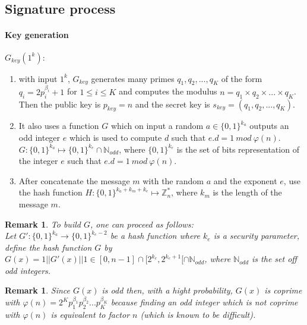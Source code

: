 \documentclass[a4paper,11pt]{article}
\newtheorem{remark}[theorem]{Remark}
\begin{document}
\subsection{Signature process }\label{sec:three:1}

\paragraph{Key generation}  $G_{key}(1^{k}):$

\label{Key generation 1}
\begin{enumerate}
\item  with input $1^k$, $G_{key}$ generates many primes $q_1,q_2,...,q_K$ of the form $q_i=2p_i^{\beta_i}+1$ for $1\leq i \leq K$ and computes the modulus $n=q_1\times q_2\times ...\times q_K$. Then the public key is $p_{key}=n$ and the secret key is $s_{key}=(q_1,q_2,...,q_K)$.
\item  It also uses a function $G$ which on input a random $a \in \{0,1\}^{k_a}$ outputs an odd integer $e$ which is used to compute $d$ such that $e.d=1 \ mod \ \varphi(n)$.\\
$G:\{0,1\}^{k_a}\stackrel{}{\longmapsto}\{0,1\}^{k_e}\cap \mathbb{N}_{odd}$, where  $ \{0,1\}^{k_e}$ is the set of bits representation of the integer $e$ such that $e.d=1 \ mod \ \varphi(n)$.
\item After concatenate the message $m$ with the random $a$ and the exponent $e$, use the hash function $H:\{0,1\}^{k_a+k_m+k_e}\stackrel{}{\longmapsto}\mathbb Z_n^*$, where $k_m$ is the length of the message $m$.\\

\end{enumerate}
 
\begin{remark} To build $G$, one can proceed as follows:\\
 Let $ G': \{0, 1\}^{k_{a}} \rightarrow  \{0,1\}^{k_{e}-2}$ be a hash function where $k_{e}$ is a security parameter,
define the hash function  $G$  by $G(x)=1||G'(x)||1 \in [0, n-1] \cap [ 2^{k_{e}}, 2^{k_{e}+1}[\cap \mathbb{N}_{odd} $, where $\mathbb{N}_{odd} $ is the set off odd integers.
\end{remark}

\begin{remark}
Since $G(x)$ is odd then, with a hight probability, $G(x)$ is coprime with $\varphi(n)=2^Kp^{\beta_{1}}_{1}p^{\beta_{2}}_{2}...p^{\beta_K}_K$ because finding an odd integer which is not coprime with $\varphi(n)$ is equivalent to factor $n$ (which is known to be difficult).
\end{remark}
\end{document}
